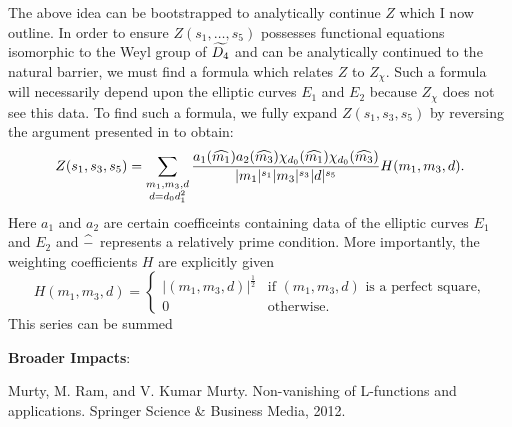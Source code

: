 \documentclass[12pt,reqno,oneside]{amsart}
\begin{document}
The above idea can be bootstrapped to analytically continue $Z$ which I now outline. In order to ensure $Z(s_{1},\ldots,s_{5})$ possesses functional equations isomorphic to the Weyl group of $\widetilde{D_{4}}$ and can be analytically continued to the natural barrier, we must find a formula which relates $Z$ to $Z_{\chi}$. Such a formula will necessarily depend upon the elliptic curves $E_{1}$ and $E_{2}$ because $Z_{\chi}$ does not see this data. To find such a formula, we fully expand $Z(s_{1},s_{3},s_{5})$ by reversing the argument presented in  to obtain:
\[
  Z(s_{1},s_{3},s_{5}) = \sum_{\substack{m_{1},m_{3},d \\ d = d_{0}d_{1}^{2}}}\frac{a_{1}(\widehat{m_{1}})a_{2}(\widehat{m_{3}})\chi_{d_{0}}(\widehat{m_{1}})\chi_{d_{0}}(\widehat{m_{3}})}{|m_{1}|^{s_{1}}|m_{3}|^{s_{3}}|d|^{s_{5}}}H(m_{1},m_{3},d).
\]
Here $a_{1}$ and $a_{2}$ are certain coefficeints containing data of the elliptic curves $E_{1}$ and $E_{2}$ and $\widehat{-}$ represents a relatively prime condition. More importantly, the weighting coefficients $H$ are explicitly given
\[
  H(m_{1},m_{3},d) = \begin{cases} |(m_{1},m_{3},d)|^{\frac{1}{2}} & \text{if $(m_{1},m_{3},d)$ is a perfect square,} \\ 0 & \text{otherwise.} \end{cases}
\]
This series can be summed 


\textbf{Broader Impacts}:

\begin{thebibliography}{}
  Murty, M. Ram, and V. Kumar Murty. Non-vanishing of L-functions and applications. Springer Science \& Business Media, 2012.
\end{thebibliography}
\end{document}
